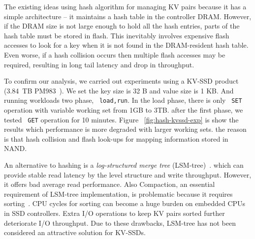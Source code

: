 \documentclass{abstract_hutech}
\begin{document}
The existing ideas using hash algorithm for managing KV pairs because it has a simple architecture -- it maintains a hash table in the controller DRAM.
However, if the DRAM size is not large enough to hold all the hash entries, parts of the hash table must be stored in flash.
This inevitably involves expensive flash accesses to look for a key when it is not found in the DRAM-resident hash table.  
Even worse, if a hash collision occurs then multiple flash accesses may be required, resulting in long tail latency and drop in throughput.

To confirm our analysis, we carried out experiments using a KV-SSD product (3.84~TB PM983~\cite{pm983,kv-pm983}).
We set the key size is 32 B and value size is 1 KB. And running workloads two phase, ~\texttt{load,run}. 
In the load phase, there is only ~\texttt{SET} operation with variable working set from 1GB to 3TB.
after the first phase, we tested ~\texttt{GET} operation for 10 minutes. 
Figure ~\ref{fig:hash-kvssd-exp} is show the results which performance is more degraded with larger working sets.
the reason is that hash collision and flash look-ups for mapping information stored in NAND.


An alternative to hashing is a \emph{log-structured merge tree} (LSM-tree)~\cite{lsm-tree}. which can provide stable read latency by the level structure and write throughput.
However, it offers bad average read performance. Also Compaction, an essential requirement of LSM-tree implementation, is problematic because it requires sorting~\cite{wisckey,blsm,silk}.
CPU cycles for sorting can become a huge burden on embedded CPUs in SSD controllers. Extra I/O operations to keep KV pairs sorted further deteriorate I/O throughput.  
Due to these drawbacks, LSM-tree has not been considered an attractive solution for KV-SSDs.
\end{document}
